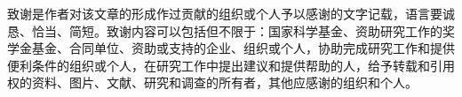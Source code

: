 
\begin{acknowledgements}
    致谢是作者对该文章的形成作过贡献的组织或个人予以感谢的文字记载，语言要诚恳、恰当、简短。致谢内容可以包括但不限于：国家科学基金、资助研究工作的奖学金基金、合同单位、资助或支持的企业、组织或个人，协助完成研究工作和提供便利条件的组织或个人，在研究工作中提出建议和提供帮助的人，给予转载和引用权的资料、图片、文献、研究和调查的所有者，其他应感谢的组织和个人。
\end{acknowledgements}